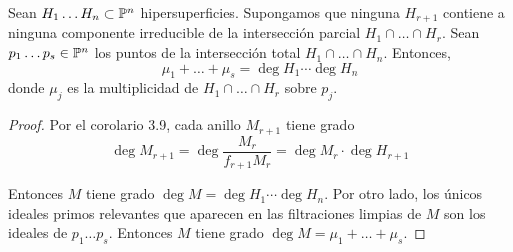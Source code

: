 \begin{theorem}
Sean $H_1 \dots H_n \subset \P^n$ hipersuperficies. Supongamos que ninguna $H_{r+1}$ contiene a ninguna componente irreducible de la intersección parcial $H_1 \cap \dots \cap H_r$. Sean $p_1 \dots p_s \in \P^n$ los puntos de la intersección total $H_1 \cap \dots \cap H_n$. Entonces,
$$\mu_1 + \dots + \mu_s = \deg H_1 \cdots \deg H_n$$
donde $\mu_j$ es la multiplicidad de $H_1 \cap \dots \cap H_r$ sobre $p_j$.
\end{theorem}

\begin{proof}
Por el corolario 3.9, cada anillo $M_{r+1}$ tiene grado
$$\deg M_{r+1} = \deg \frac {M_r} {f_{r+1} M_r} = \deg M_r \cdot \deg H_{r+1}$$

Entonces $M$ tiene grado $\deg M = \deg H_1 \cdots \deg H_n$. Por otro lado, los únicos ideales primos relevantes que aparecen en las filtraciones limpias de $M$ son los ideales de $p_1 \dots p_s$. Entonces $M$ tiene grado $\deg M = \mu_1 + \dots + \mu_s$.
\end{proof}
